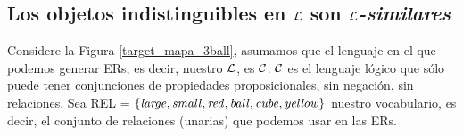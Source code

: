 \subsection{Los objetos indistinguibles en $\mathcal{L}$ son \emph{$\mathcal{L}$-similares}}
\label{sec:indistinguibles}

Considere la Figura \ref{target_mapa_3ball}, asumamos que el lenguaje en el que podemos generar ERs, es decir, nuestro $\mathcal{L}$, es $\mathcal{C}$. $\mathcal{C}$ es el lenguaje l\'ogico
que s\'olo puede tener conjunciones de propiedades proposicionales, 
sin negaci\'on, sin relaciones. Sea REL = $\{\mathit{large}, \mathit{small}, \mathit{red}, \mathit{ball}, \mathit{cube}, \mathit{yellow} \}$ nuestro vocabulario, es decir, el conjunto de relaciones (unarias) que podemos usar en las ERs.

